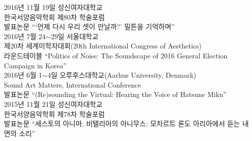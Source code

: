 \documentclass[dvipdfmx,a4paper]{article}
\begin{document}
  \noindent 2016년 11월 19일 성신여자대학교\\
  한국서양음악학회 제80차 학술포럼\\
  발표논문 “‘언제 다시 우리 셋이 만날까?’ 밀튼을 기억하며”\\
  
  \noindent 2016년 7월 24$\sim$29일 서울대학교\\
  제20차 세계미학자대회(20th International Congress of Aesthetics)\\
  라운드테이블 “Politics of Noise: The Soundscape of 2016 General Election Campaign in Korea”\\
  
  \noindent 2016년 6월 1$\sim$4일 오루후스대학교(Aarhus University, Denmark)\\
  Sound Art Matters, International Conference\\
  발표논문 “(Re)sounding the Virtual: Hearing the Voice of Hatsune Miku”\\
  
  \noindent 2015년 11월 21일 성신여자대학교\\
  한국서양음악학회 제78차 학술포럼\\
  발표논문 “세스토의 아니마, 비텔리아의 아니무스: 모차르트 론도 아리아에서 듣는 내면의 소리”\\
  
  
  
  
  
\end{document}
